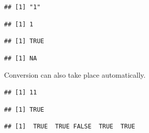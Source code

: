 \documentclass[krantz2]{krantz}\usepackage{knitr}%
\begin{document}
\begin{knitrout}\footnotesize
{}\color{fgcolor}\begin{kframe}
\begin{alltt}
\hlstd{(}\hlstd{)}
\end{alltt}
\begin{verbatim}
## [1] "1"
\end{verbatim}
\begin{alltt}
\hlstd{(}\hlstd{)}
\end{alltt}
\begin{verbatim}
## [1] 1
\end{verbatim}
\begin{alltt}
\hlstd{(}\hlstd{)}
\end{alltt}
\begin{verbatim}
## [1] TRUE
\end{verbatim}
\begin{alltt}
\hlstd{(}\hlstd{)}
\end{alltt}
\begin{verbatim}
## [1] NA
\end{verbatim}
\end{kframe}
\end{knitrout}

Conversion can also take place automatically.
\begin{knitrout}\footnotesize
{}\color{fgcolor}\begin{kframe}
\begin{alltt}
 \hlopt{+} 
\end{alltt}
\begin{verbatim}
## [1] 11
\end{verbatim}
\begin{alltt}
 \hlopt{||} 
\end{alltt}
\begin{verbatim}
## [1] TRUE
\end{verbatim}
\begin{alltt}
 \hlopt{| -}\hlopt{:}
\end{alltt}
\begin{verbatim}
## [1]  TRUE  TRUE FALSE  TRUE  TRUE
\end{verbatim}
\end{kframe}
\end{knitrout}
\end{document}
